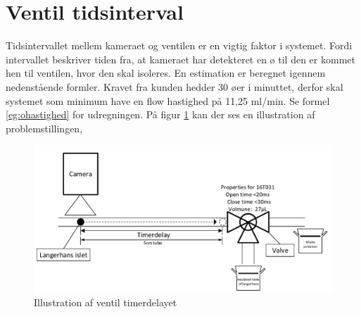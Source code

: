 

 \section{Ventil tidsinterval}
Tidsintervallet mellem kameraet og ventilen er en vigtig faktor i systemet. Fordi intervallet beskriver tiden fra, at kameraet har detekteret en ø til den er kommet hen til ventilen, hvor den skal isoleres. En estimation er beregnet igennem nedenstående formler. Kravet fra kunden hedder 30 øer i minuttet, derfor skal systemet som minimum have en flow hastighed på 11,25 ml/min. Se formel \ref{eg:ohastighed} for udregningen. På figur \ref{fig:tidsintervalventil} kan der ses en illustration af problemstillingen,

\begin{figure}[H]
	\centering
	\includegraphics[width=1\textwidth]{billeder/Hovedrapport/tidsinterval.pdf}
	\caption{Illustration af ventil timerdelayet}
	\label{fig:tidsintervalventil}
\end{figure}

